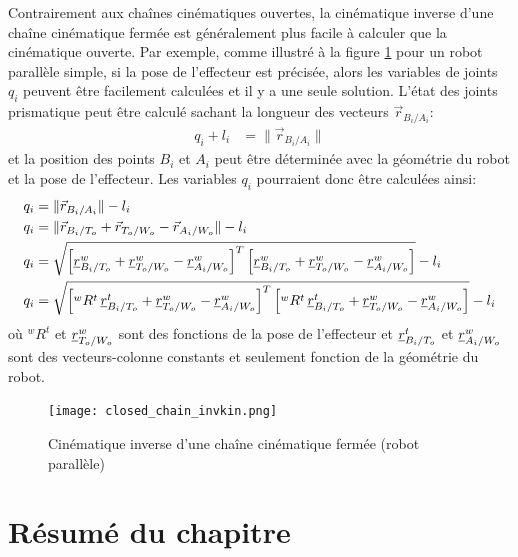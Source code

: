 Contrairement aux chaînes cinématiques ouvertes, la cinématique inverse d'une chaîne cinématique fermée est généralement plus facile à calculer que la cinématique ouverte. Par exemple, comme illustré à la figure \ref{fig:closed_chain_invkin} pour un robot parallèle simple, si la pose de l'effecteur est précisée, alors les variables de joints $q_i$ peuvent être facilement calculées et il y a une seule solution. L'état des joints prismatique peut être calculé sachant la longueur des vecteurs $\vec{r}_{B_i/A_i}$:
\begin{align}
	q_i + l_i &= \| \vec{r}_{B_i/A_i} \|
\end{align}
et la position des points $B_i$ et $A_i$ peut être déterminée avec la géométrie du robot et la pose de l'effecteur. Les variables $q_i$ pourraient donc être calculées ainsi:
\begin{align}
	q_i &= \| \vec{r}_{B_i/A_i} \| - l_i \\
	q_i &= \| \vec{r}_{B_i/T_o} +  \vec{r}_{T_o/W_o} - \vec{r}_{A_i/W_o} \| - l_i \\
	q_i &= \sqrt{\left[  \underline{r}_{B_i/T_o}^w + \underline{r}_{T_o/W_o}^w - \underline{r}_{A_i/W_o}^w
		\right]^T \left[  \underline{r}_{B_i/T_o}^w + \underline{r}_{T_o/W_o}^w - \underline{r}_{A_i/W_o}^w
		\right]} - l_i \\
	q_i &= \sqrt{\left[  {}^wR^t \, \underline{r}_{B_i/T_o}^t + \underline{r}_{T_o/W_o}^w - \underline{r}_{A_i/W_o}^w
		\right]^T \left[  {}^wR^t \, \underline{r}_{B_i/T_o}^t + \underline{r}_{T_o/W_o}^w - \underline{r}_{A_i/W_o}^w \right]} - l_i
\end{align}
où ${}^wR^t$ et $\underline{r}_{T_o/W_o}^w$ sont des fonctions de la pose de l'effecteur et $\underline{r}_{B_i/T_o}^t$ et $\underline{r}_{A_i/W_o}^w$ sont des vecteurs-colonne constants et seulement fonction de la géométrie du robot.

\begin{figure}[H]
	\centering
	\texttt{[image: closed\_chain\_invkin.png]}
	\caption{Cinématique inverse d'une chaîne cinématique fermée (robot parallèle)}
	\label{fig:closed_chain_invkin}
\end{figure}




\newpage
\section{Résumé du chapitre}

